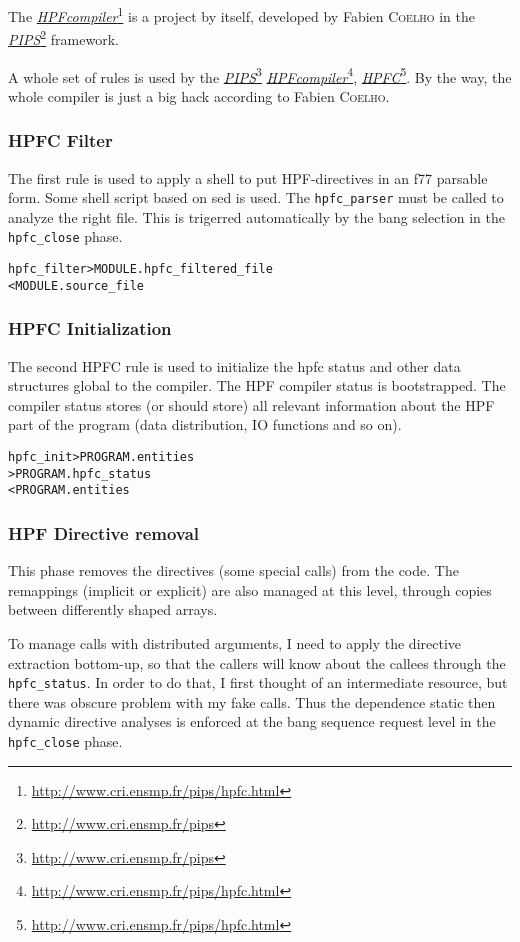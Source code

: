 \documentclass[a4paper]{report}
\newenvironment{PipsMake}{\begin{alltt}}{\end{alltt}}
\newcommand{\LINK}[2]{\href{#2}{#1}\footnote{\url{#2}}\xspace}
\newcommand{\HPFC}{\LINK{\emph{HPFC}}{http://www.cri.ensmp.fr/pips/hpfc.html}}
\newcommand{\HPFcompiler}{\LINK{\emph{HPF\space{}compiler}}{http://www.cri.ensmp.fr/pips/hpfc.html}}
\newcommand{\PIPS}{\LINK{\emph{PIPS}}{http://www.cri.ensmp.fr/pips}}
\begin{document}
The \HPFcompiler{} is a project by itself, developed by Fabien
\textsc{Coelho} in the \PIPS{} framework.

A whole set of rules is used by the \PIPS{} \HPFcompiler{}, \HPFC{}.  By
the way, the whole compiler is just a big hack according to Fabien
\textsc{Coelho}.

\subsubsection{HPFC Filter}

The first rule is used to apply a shell to put HPF-directives in an f77 parsable form.
Some shell script based on sed is used. The \verb+hpfc_parser+ must be
called to analyze the right file. This is trigerred automatically by the
bang selection in the \verb|hpfc_close| phase.

\begin{PipsMake}
hpfc_filter             > MODULE.hpfc_filtered_file
    < MODULE.source_file
\end{PipsMake}

\subsubsection{HPFC Initialization}

The second HPFC rule is used to initialize the hpfc status and other data
structures global to the compiler. The HPF compiler
status is bootstrapped. The compiler status stores (or should store) all relevant
information about the HPF part of the program (data distribution, IO
functions and so on).

\begin{PipsMake}
hpfc_init              > PROGRAM.entities
                       > PROGRAM.hpfc_status
    < PROGRAM.entities
\end{PipsMake}

\subsubsection{HPF Directive removal}

This phase removes the directives (some special calls) from the code.
The remappings (implicit or explicit) are also managed at this level,
through copies between differently shaped arrays.

To manage calls with distributed arguments, I need to apply the directive
extraction bottom-up, so that the callers will know about the callees
through the \verb+hpfc_status+. In order to do that, I first thought of an
intermediate resource, but there was obscure problem with my fake calls.
Thus the dependence static then dynamic directive analyses is enforced at
the bang sequence request level in the \verb|hpfc_close| phase.
\end{document}
